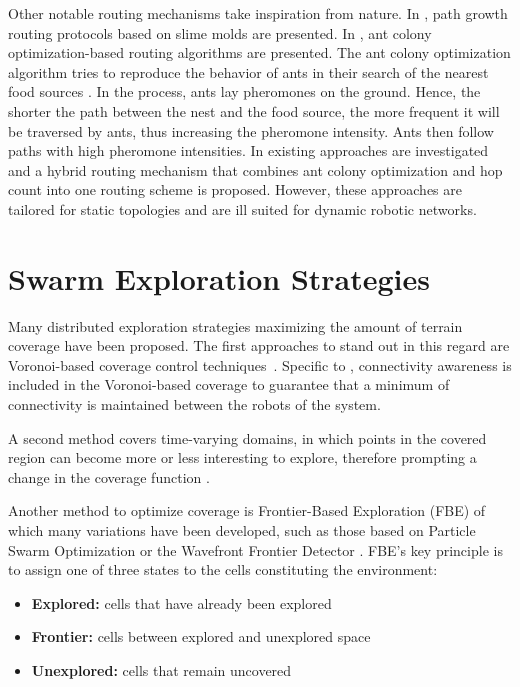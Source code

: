Other notable routing mechanisms take inspiration from nature. In \cite{li2011slime,jiang2018toward}, path growth routing protocols based on slime molds are presented. In \cite{jiang2018effective,liao2008data}, ant colony optimization-based routing algorithms are presented. The ant colony optimization algorithm tries to reproduce the behavior of ants in their search of the nearest food sources \cite{dorigo1996ant}. In the process, ants lay pheromones on the ground. Hence, the shorter the path between the nest and the food source, the more frequent it will be traversed by ants, thus increasing the pheromone intensity. Ants then follow paths with high pheromone intensities. In \cite{liao2008data} existing approaches are investigated and a hybrid routing mechanism that combines ant colony optimization and hop count into one routing scheme is proposed. However, these approaches are tailored for static topologies and are ill suited for dynamic robotic networks.


\section{Swarm Exploration Strategies}
Many distributed exploration strategies maximizing the amount of
terrain coverage have been proposed. The first approaches to stand out
in this regard are Voronoi-based coverage control
techniques~\cite{arslan2016voronoi,luo2019voronoi}.
Specific to \cite{luo2019voronoi}, connectivity awareness is included in the Voronoi-based coverage to guarantee that a minimum of connectivity is maintained between the robots of the system. 

A second method covers time-varying domains, in which points in the
covered region can become more or less interesting to explore,
therefore prompting a change in the coverage function
\cite{santos2019decentralized,xu2019multi}. 

Another method to optimize coverage is Frontier-Based Exploration (FBE)
\cite{yamauchi1998frontier} of which many variations have been
developed, such as those based on Particle Swarm Optimization
\cite{wang2011frontier} or the Wavefront Frontier Detector
\cite{topiwala2018frontier}. FBE's key principle is to assign one of three states to the cells constituting the environment:

\begin{itemize}
\item \textbf{Explored:} cells that have already been explored
\item \textbf{Frontier:} cells between explored and unexplored space
\item \textbf{Unexplored:} cells that remain uncovered
\end{itemize}

